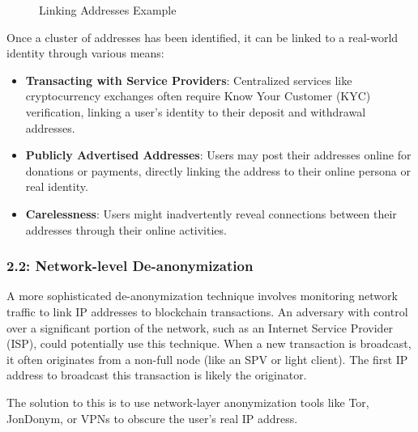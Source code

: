 \begin{figure}
\centering
\caption{Linking Addresses Example}
\end{figure}

Once a cluster of addresses has been identified, it can be linked to a
real-world identity through various means:

\begin{itemize}
\tightlist
\item
  \textbf{Transacting with Service Providers}: Centralized services like
  cryptocurrency exchanges often require Know Your Customer (KYC)
  verification, linking a user's identity to their deposit and
  withdrawal addresses.
\item
  \textbf{Publicly Advertised Addresses}: Users may post their addresses
  online for donations or payments, directly linking the address to
  their online persona or real identity.
\item
  \textbf{Carelessness}: Users might inadvertently reveal connections
  between their addresses through their online activities.
\end{itemize}


\subsubsection{2.2: Network-level
De-anonymization}\label{network-level-de-anonymization}

A more sophisticated de-anonymization technique involves monitoring
network traffic to link IP addresses to blockchain transactions. An
adversary with control over a significant portion of the network, such
as an Internet Service Provider (ISP), could potentially use this
technique. When a new transaction is broadcast, it often originates from
a non-full node (like an SPV or light client). The first IP address to
broadcast this transaction is likely the originator.

The solution to this is to use network-layer anonymization tools like
Tor, JonDonym, or VPNs to obscure the user's real IP address.

